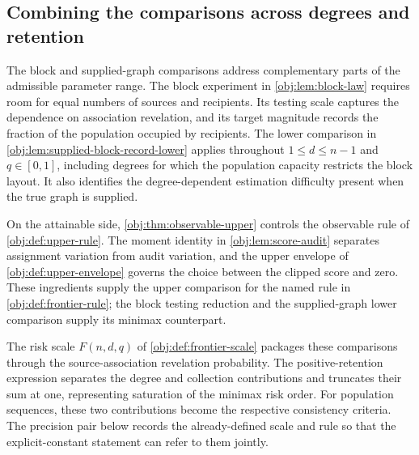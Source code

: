 \documentclass[11pt]{article}
\begin{document}
\subsection{Combining the comparisons across degrees and retention}

The block and supplied-graph comparisons address complementary parts of the admissible parameter range. The block experiment in \cref{obj:lem:block-law} requires room for equal numbers of sources and recipients. Its testing scale captures the dependence on association revelation, and its target magnitude records the fraction of the population occupied by recipients. The lower comparison in \cref{obj:lem:supplied-block-record-lower} applies throughout \(1\le d\le n-1\) and \(q\in[0,1]\), including degrees for which the population capacity restricts the block layout. It also identifies the degree-dependent estimation difficulty present when the true graph is supplied.

On the attainable side, \cref{obj:thm:observable-upper} controls the observable rule of \cref{obj:def:upper-rule}. The moment identity in \cref{obj:lem:score-audit} separates assignment variation from audit variation, and the upper envelope of \cref{obj:def:upper-envelope} governs the choice between the clipped score and zero. These ingredients supply the upper comparison for the named rule in \cref{obj:def:frontier-rule}; the block testing reduction and the supplied-graph lower comparison supply its minimax counterpart.

The risk scale \(F(n,d,q)\) of \cref{obj:def:frontier-scale} packages these comparisons through the source-association revelation probability. The positive-retention expression separates the degree and collection contributions and truncates their sum at one, representing saturation of the minimax risk order. For population sequences, these two contributions become the respective consistency criteria. The precision pair below records the already-defined scale and rule so that the explicit-constant statement can refer to them jointly.
\end{document}
